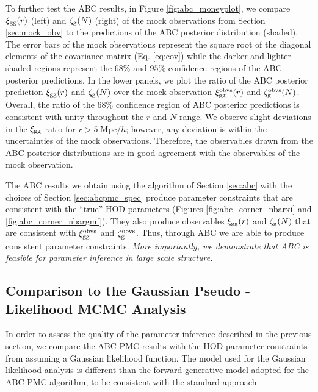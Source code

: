 To further test the ABC results, in Figure \ref{fig:abc_moneyplot}, 
we compare $\xi_{\mathrm{gg}}(r)$ (left) and $\mathcal{\zeta}_{\rm g}(N)$ (right) of the mock observations from Section \ref{sec:mock_obv}
to the predictions of the ABC posterior distribution (shaded). The error bars of the mock observations 
represent the square root of the diagonal elements of the covariance matrix (Eq. \ref{eq:cov}) while the 
darker and lighter shaded regions represent the $68\%$ and $95\%$ confidence regions of the ABC posterior 
predictions. In the lower panels, we plot the ratio of the ABC posterior prediction $\xi_{\mathrm{gg}}(r)$ and $\mathcal{\zeta}_{\rm g}(N)$ over
the mock observation $\xi_{\mathrm{gg}}^\mathrm{obvs}(r)$ and $\mathcal{\zeta}_{\rm g}^\mathrm{obvs}(N)$. Overall, the 
ratio of the $68\%$ confidence region of ABC posterior predictions is consistent with unity 
throughout the $r$ and $N$ range. We observe slight deviations in the $\xi_{\mathrm{gg}}$ ratio for 
$r > 5\;\mathrm{Mpc}/h$; however, any deviation is within the uncertainties of the mock observations. 
Therefore, the observables drawn from the ABC posterior distributions are in good agreement with the
observables of the mock observation. 

The ABC results we obtain using the algorithm of Section \ref{sec:abc} with the choices of
Section \ref{sec:abcpmc_spec} produce parameter constraints that are consistent with 
the ``true'' HOD parameters (Figures \ref{fig:abc_corner_nbarxi} and \ref{fig:abc_corner_nbargmf}).
They also produce observables $\xi_{\mathrm{gg}}(r)$ and $\mathcal{\zeta}_{\rm g}(N)$ that are consistent with $\xi_{\mathrm{gg}}^\mathrm{obvs}$ 
and $\mathcal{\zeta}_{\rm g}^\mathrm{obvs}$. Thus, through ABC we are able to produce consistent 
parameter constraints. {\em More importantly, we demonstrate that ABC is feasible 
for parameter inference in large scale structure.} %

\subsection{Comparison to the Gaussian Pseudo - Likelihood MCMC Analysis} \label{sec:abcvsmcmc}
In order to assess the quality of the parameter inference described in the previous section, 
we compare the ABC-PMC results with the HOD parameter constraints 
from assuming a Gaussian likelihood 
function. The model used for the Gaussian likelihood analysis is different than the forward 
generative model adopted for the ABC-PMC algorithm, to be consistent with the standard approach.

